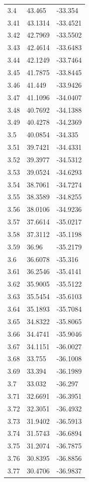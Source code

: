 \begin{table}
\begin{tabular}{lll}
3.4 & 43.465 & -33.354 \\
3.41 & 43.1314 & -33.4521 \\
3.42 & 42.7969 & -33.5502 \\
3.43 & 42.4614 & -33.6483 \\
3.44 & 42.1249 & -33.7464 \\
3.45 & 41.7875 & -33.8445 \\
3.46 & 41.449 & -33.9426 \\
3.47 & 41.1096 & -34.0407 \\
3.48 & 40.7692 & -34.1388 \\
3.49 & 40.4278 & -34.2369 \\
3.5 & 40.0854 & -34.335 \\
3.51 & 39.7421 & -34.4331 \\
3.52 & 39.3977 & -34.5312 \\
3.53 & 39.0524 & -34.6293 \\
3.54 & 38.7061 & -34.7274 \\
3.55 & 38.3589 & -34.8255 \\
3.56 & 38.0106 & -34.9236 \\
3.57 & 37.6614 & -35.0217 \\
3.58 & 37.3112 & -35.1198 \\
3.59 & 36.96 & -35.2179 \\
3.6 & 36.6078 & -35.316 \\
3.61 & 36.2546 & -35.4141 \\
3.62 & 35.9005 & -35.5122 \\
3.63 & 35.5454 & -35.6103 \\
3.64 & 35.1893 & -35.7084 \\
3.65 & 34.8322 & -35.8065 \\
3.66 & 34.4741 & -35.9046 \\
3.67 & 34.1151 & -36.0027 \\
3.68 & 33.755 & -36.1008 \\
3.69 & 33.394 & -36.1989 \\
3.7 & 33.032 & -36.297 \\
3.71 & 32.6691 & -36.3951 \\
3.72 & 32.3051 & -36.4932 \\
3.73 & 31.9402 & -36.5913 \\
3.74 & 31.5743 & -36.6894 \\
3.75 & 31.2074 & -36.7875 \\
3.76 & 30.8395 & -36.8856 \\
3.77 & 30.4706 & -36.9837 \\

\end{tabular}
\end{table}
